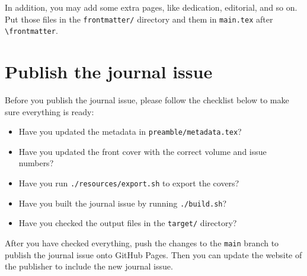 In addition, you may add some extra pages, like dedication, editorial, and so on.
Put those files in the \texttt{frontmatter/} directory and \verb|| them in \texttt{main.tex} after \verb|\frontmatter|.

\section{Publish the journal issue}

Before you publish the journal issue, please follow the checklist below to make sure everything is ready:
\begin{itemize}
  \item Have you updated the metadata in \verb|preamble/metadata.tex|?
  \item Have you updated the front cover with the correct volume and issue numbers?
  \item Have you run \verb|./resources/export.sh| to export the covers?
  \item Have you built the journal issue by running \verb|./build.sh|?
  \item Have you checked the output files in the \verb|target/| directory?
\end{itemize}

After you have checked everything, push the changes to the \verb|main| branch to publish the journal issue onto GitHub Pages.
Then you can update the website of the publisher to include the new journal issue.
